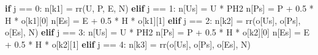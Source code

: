 \documentclass[
  a4paper,
]{article}
\newenvironment{Shaded}{}{}
\newcommand{\ControlFlowTok}[1]{\textcolor[rgb]{0.00,0.44,0.13}{\textbf{#1}}}
\newcommand{\DecValTok}[1]{\textcolor[rgb]{0.25,0.63,0.44}{#1}}
\newcommand{\FloatTok}[1]{\textcolor[rgb]{0.25,0.63,0.44}{#1}}
\newcommand{\NormalTok}[1]{#1}
\newcommand{\OperatorTok}[1]{\textcolor[rgb]{0.40,0.40,0.40}{#1}}
\newcommand{\StringTok}[1]{\textcolor[rgb]{0.25,0.44,0.63}{#1}}
\begin{document}
\begin{Shaded}
\begin{Highlighting}[]
    \ControlFlowTok{if}\NormalTok{ j }\OperatorTok{==} \DecValTok{0}\NormalTok{:}
\NormalTok{        n[}\StringTok{\textquotesingle{}k1\textquotesingle{}}\NormalTok{] }\OperatorTok{=}\NormalTok{ rr(U, P, E, N)}
    \ControlFlowTok{elif}\NormalTok{ j }\OperatorTok{==} \DecValTok{1}\NormalTok{:}
\NormalTok{        n[}\StringTok{\textquotesingle{}Us\textquotesingle{}}\NormalTok{] }\OperatorTok{=}\NormalTok{ U }\OperatorTok{*}\NormalTok{ PH2}
\NormalTok{        n[}\StringTok{\textquotesingle{}Ps\textquotesingle{}}\NormalTok{] }\OperatorTok{=}\NormalTok{ P }\OperatorTok{+} \FloatTok{0.5} \OperatorTok{*}\NormalTok{ H }\OperatorTok{*}\NormalTok{ o[}\StringTok{\textquotesingle{}k1\textquotesingle{}}\NormalTok{][}\DecValTok{0}\NormalTok{]}
\NormalTok{        n[}\StringTok{\textquotesingle{}Es\textquotesingle{}}\NormalTok{] }\OperatorTok{=}\NormalTok{ E }\OperatorTok{+} \FloatTok{0.5} \OperatorTok{*}\NormalTok{ H }\OperatorTok{*}\NormalTok{ o[}\StringTok{\textquotesingle{}k1\textquotesingle{}}\NormalTok{][}\DecValTok{1}\NormalTok{]}
    \ControlFlowTok{elif}\NormalTok{ j }\OperatorTok{==} \DecValTok{2}\NormalTok{:}
\NormalTok{        n[}\StringTok{\textquotesingle{}k2\textquotesingle{}}\NormalTok{] }\OperatorTok{=}\NormalTok{ rr(o[}\StringTok{\textquotesingle{}Us\textquotesingle{}}\NormalTok{], o[}\StringTok{\textquotesingle{}Ps\textquotesingle{}}\NormalTok{], o[}\StringTok{\textquotesingle{}Es\textquotesingle{}}\NormalTok{], N)}
    \ControlFlowTok{elif}\NormalTok{ j }\OperatorTok{==} \DecValTok{3}\NormalTok{:}
\NormalTok{        n[}\StringTok{\textquotesingle{}Us\textquotesingle{}}\NormalTok{] }\OperatorTok{=}\NormalTok{ U }\OperatorTok{*}\NormalTok{ PH2}
\NormalTok{        n[}\StringTok{\textquotesingle{}Ps\textquotesingle{}}\NormalTok{] }\OperatorTok{=}\NormalTok{ P }\OperatorTok{+} \FloatTok{0.5} \OperatorTok{*}\NormalTok{ H }\OperatorTok{*}\NormalTok{ o[}\StringTok{\textquotesingle{}k2\textquotesingle{}}\NormalTok{][}\DecValTok{0}\NormalTok{]}
\NormalTok{        n[}\StringTok{\textquotesingle{}Es\textquotesingle{}}\NormalTok{] }\OperatorTok{=}\NormalTok{ E }\OperatorTok{+} \FloatTok{0.5} \OperatorTok{*}\NormalTok{ H }\OperatorTok{*}\NormalTok{ o[}\StringTok{\textquotesingle{}k2\textquotesingle{}}\NormalTok{][}\DecValTok{1}\NormalTok{]}
    \ControlFlowTok{elif}\NormalTok{ j }\OperatorTok{==} \DecValTok{4}\NormalTok{:}
\NormalTok{        n[}\StringTok{\textquotesingle{}k3\textquotesingle{}}\NormalTok{] }\OperatorTok{=}\NormalTok{ rr(o[}\StringTok{\textquotesingle{}Us\textquotesingle{}}\NormalTok{], o[}\StringTok{\textquotesingle{}Ps\textquotesingle{}}\NormalTok{], o[}\StringTok{\textquotesingle{}Es\textquotesingle{}}\NormalTok{], N)}

\end{Highlighting}
\end{Shaded}
\end{document}
